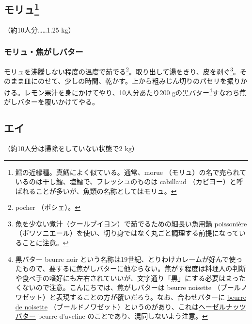 \begin{Main}
\hypertarget{morue}{%
\subsection[モリュ]{\texorpdfstring{モリュ\footnote{鱈の近縁種。真鱈によく似ている。通常、morue
  （モリュ）の名で売られているのは干し鱈、塩鱈で、フレッシュのものは
  cabillaud
  （カビヨー）と呼ばれることが多いが、魚類の名称としてはモリュ。}}{モリュ}}\label{morue}}


 

（約10人分\ldots{}\ldots{}1.25 kg）

\hypertarget{morue-au-beurre-noir-ou-au-beurre-noisette}{%
\subsubsection{モリュ・焦がしバター}\label{morue-au-beurre-noir-ou-au-beurre-noisette}}

モリュを沸騰しない程度の温度で茹でる\footnote{pocher （ポシェ）。}。取り出して湯をきり、皮を剥ぐ\footnote{魚を少ない煮汁（クールブイヨン）で茹でるための細長い魚用鍋
  poissonière
  （ポワソニエール）を使い、切り身ではなく丸ごと調理する前提になっていることに注意。}。そのまま皿にのせて、少しの時間、乾かす。上から粗みじん切りのパセリを振りかける。レモン果汁を身にかけてやり、10人分あたり200
gの黒バター\footnote{黒バター beurre noir
  という名称は19世紀、とりわけカレームが好んで使ったもので、要するに焦がしバターに他ならない。焦がす程度は料理人の判断や食べ手の嗜好にも左右されていいが、文字通り「黒」にする必要はまったくないので注意。こんにちでは、焦がしバターは
  beurre noisette
  （ブールノワゼット）と表現することの方が覆いだろう。なお、合わせバターに
  \protect\hyperlink{beurre-de-noisette}{beurre de noisette}
  （ブールドノワゼット）というのがあり、これは\protect\hyperlink{beurre-d-aveline}{ヘーゼルナッツバター}
  beurre d'aveline のことであり、混同しないよう注意。}すなわち焦がしバターを覆いかけてやる。

\hypertarget{raie}{%
\subsection{エイ}\label{raie}}


 

（約10人分は掃除をしていない状態で2 kg）


\end{Main}
